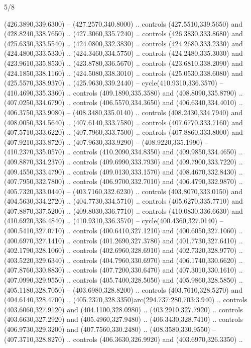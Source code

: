\begin{flagdescription}{5/8}
\begin{scope}[xshift=0.5\flaglength,yshift=0.5\flagwidth,scale=\flagwidth/475.63]
\begin{scope}[y=0.8pt, x=0.8pt, yscale=-1, xscale=1,shift={(-450,-300)}]
\begin{scope}[cm={{1.0,0.0,0.0,1.0,(-0.0002,0.12556)}},cm={{1.0,0.0,0.0,1.0,(0.00179,0.0)}}]
\begin{scope}[fill=c00863d]
  (426.3890,339.6300) -- (427.2570,340.8000) .. controls (427.5510,339.5650) and
  (428.8240,338.7650) .. (427.3060,335.7240) .. controls (426.3830,333.8680) and
  (425.6330,333.5540) .. (424.0800,332.3830) .. controls (424.2680,333.2330) and
  (424.4800,333.5330) .. (424.3460,334.5750) .. controls (424.2480,335.3030) and
  (423.9610,335.8530) .. (423.8780,336.5670) .. controls (423.6810,338.2090) and
  (424.1850,338.1160) .. (424.5080,338.3010) .. controls (425.0530,338.6080) and
  (425.5570,338.9370) .. (425.9630,339.2440) -- cycle(410.9310,336.3570) --
  (410.4690,335.3360) .. controls (409.1890,335.3580) and (408.8090,335.8790) ..
  (407.0250,334.6790) .. controls (406.5570,334.3650) and (406.6340,334.4010) ..
  (406.3750,333.9080) -- (408.3480,335.0140) .. controls (408.2430,334.7940) and
  (408.0050,334.5640) .. (407.6140,333.7580) .. controls (407.6770,333.7160) and
  (407.5710,333.6220) .. (407.7960,333.7500) .. controls (407.8860,333.8000) and
  (407.9210,333.8720) .. (407.9630,333.9290) -- (408.9220,335.1990) --
  (410.2370,335.0570) .. controls (410.2090,334.8350) and (409.9850,334.4650) ..
  (409.8870,334.2370) .. controls (409.6990,333.7930) and (409.7900,333.7220) ..
  (409.4550,333.4790) .. controls (409.0130,333.1570) and (408.4670,332.8430) ..
  (407.7950,332.7800) .. controls (406.9700,332.7010) and (406.4790,332.9870) ..
  (405.7320,333.0440) -- (403.7160,332.6230) .. controls (403.8070,333.0150) and
  (404.5630,334.2720) .. (404.7730,334.5710) .. controls (405.6270,335.7710) and
  (407.8870,337.5200) .. (409.8030,336.7710) .. controls (410.0830,336.6630) and
  (410.6920,336.4840) .. (410.9310,336.3570) -- cycle(400.4360,327.0140) --
  (400.5410,327.0710) .. controls (400.6410,327.1210) and (400.6050,327.1060) ..
  (400.6970,327.1410) .. controls (401.2690,327.3780) and (401.7730,327.6410) ..
  (402.1790,328.1060) .. controls (402.6960,328.6910) and (402.7320,328.9770) ..
  (403.5220,329.6340) .. controls (404.7960,330.6970) and (406.1740,330.6620) ..
  (407.8760,330.8830) .. controls (407.7200,330.6470) and (407.3010,330.1610) ..
  (407.0990,329.9550) .. controls (405.7400,328.5050) and (405.9860,328.5850) ..
  (405.1180,328.7050) -- (403.6980,328.8200) .. controls (403.7610,328.5270) and
  (404.6140,328.4700) .. (405.2370,328.3350)arc(294.737:280.703:3.940) ..
  controls (403.6060,327.9120) and (404.1100,328.0980) .. (403.2910,327.7920) ..
  controls (403.6630,327.2920) and (405.4960,327.9480) .. (406.3430,328.7410) ..
  controls (406.9730,329.3200) and (407.7560,330.2480) .. (408.3580,330.9550) --
  (407.3710,328.8270) .. controls (406.3630,326.9920) and (403.6970,326.3350) ..

\end{scope}
\end{scope}
\end{scope}
\end{scope}
\end{flagdescription}
